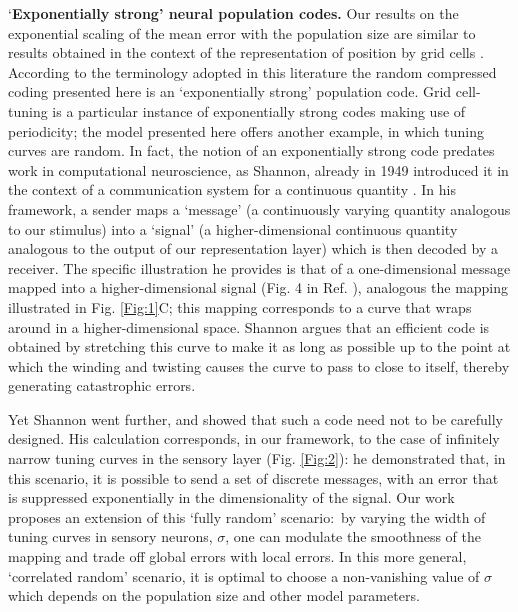 \documentclass[a4paper]{article}%
\begin{document}
`\textbf{Exponentially strong' neural population codes.} Our results on the
exponential scaling of the mean error with the population size are similar to
results obtained in the context of the representation of position by grid
cells
\cite{Fiete2008WhatLocation,Sreenivasan2011GridComputation,Mathis2012ResolutionNeurons,Wei2015ACells}%
. According to the terminology adopted in this literature the random
compressed coding presented here is an `exponentially strong' population code.
Grid cell-tuning is a particular instance of exponentially strong codes making
use of periodicity; the model presented here offers another example, in which
tuning curves are random. In fact, the notion of an exponentially strong code
predates work in computational neuroscience, as Shannon, already in 1949
introduced it in the context of a communication system for a continuous
quantity \cite{Shannon1949CommunicationNoise}. In his framework, a sender maps
a `message' (a continuously varying quantity analogous to our stimulus) into a
`signal' (a higher-dimensional continuous quantity analogous to the output of
our representation layer) which is then decoded by a receiver. The specific
illustration he provides is that of a one-dimensional message mapped into a
higher-dimensional signal (Fig. 4 in Ref. \cite{Shannon1949CommunicationNoise}%
), analogous the mapping illustrated in Fig. \ref{Fig:1}C; this mapping
corresponds to a curve that wraps around in a higher-dimensional space.
Shannon argues that an efficient code is obtained by stretching this curve to
make it as long as possible up to the point at which the winding and twisting
causes the curve to pass to close to itself, thereby generating catastrophic errors.

Yet Shannon went further, and showed that such a code need not to be carefully
designed. His calculation corresponds, in our framework, to the case of
infinitely narrow tuning curves in the sensory layer (Fig. \ref{Fig:2}): he
demonstrated that, in this scenario, it is possible to send a set of discrete
messages, with an error that is suppressed exponentially in the dimensionality
of the signal. Our work proposes an extension of this `fully random'
scenario:\ by varying the width of tuning curves in sensory neurons, $\sigma$,
one can modulate the smoothness of the mapping and trade off global errors
with local errors. In this more general, `correlated random' scenario, it is
optimal to choose a non-vanishing value of $\sigma$ which depends on the
population size and other model parameters.
\end{document}
